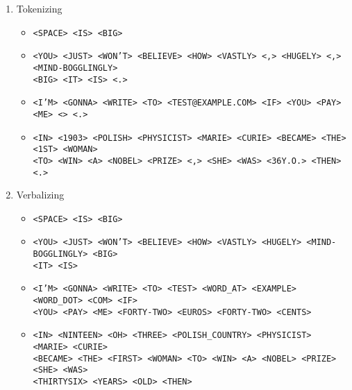 \documentclass{../labbook}
\begin{document}
\begin{solution}
    \begin{enumerate}
        \item Tokenizing
        \begin{itemize}
            \item \texttt{<SPACE> <IS> <BIG>}
            \item \texttt{<YOU> <JUST> <WON'T> <BELIEVE> <HOW> <VASTLY> <,> <HUGELY> <,> <MIND-BOGGLINGLY> \\<BIG> <IT> <IS> <.>}
            \item \texttt{<I'M> <GONNA> <WRITE> <TO> <TEST@EXAMPLE.COM> <IF> <YOU> <PAY> <ME> <> <.>}
            \item \texttt{<IN> <1903> <POLISH> <PHYSICIST> <MARIE> <CURIE> <BECAME> <THE> <1ST> <WOMAN> \\<TO> <WIN> <A> <NOBEL> <PRIZE> <,> <SHE> <WAS> <36Y.O.> <THEN> <.>}
        \end{itemize}
        \item Verbalizing
        \begin{itemize}
            \item \texttt{<SPACE> <IS> <BIG>}
            \item \texttt{<YOU> <JUST> <WON'T> <BELIEVE> <HOW> <VASTLY> <HUGELY> <MIND-BOGGLINGLY> <BIG> \\<IT> <IS>}
            \item \texttt{<I'M> <GONNA> <WRITE> <TO> <TEST> <WORD\_AT> <EXAMPLE> <WORD\_DOT> <COM> <IF> \\<YOU> <PAY> <ME> <FORTY-TWO> <EUROS> <FORTY-TWO> <CENTS>}
            \item \texttt{<IN> <NINTEEN> <OH> <THREE> <POLISH\_COUNTRY> <PHYSICIST> <MARIE> <CURIE> \\<BECAME> <THE> <FIRST> <WOMAN> <TO> <WIN> <A> <NOBEL> <PRIZE> <SHE> <WAS> \\<THIRTYSIX> <YEARS> <OLD> <THEN>}
        \end{itemize}
    \end{enumerate}

\end{solution}
\end{document}
